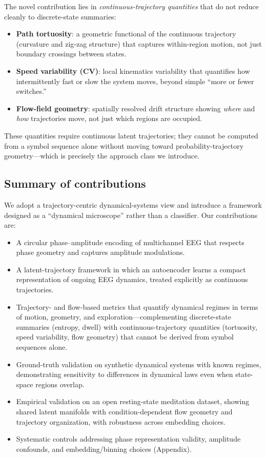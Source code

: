 \documentclass[5p,twocolumn,authoryear]{elsarticle}
\begin{document}
The novel contribution lies in \emph{continuous-trajectory quantities} that do not reduce cleanly to discrete-state summaries:
\begin{itemize}
    \item \textbf{Path tortuosity}: a geometric functional of the continuous trajectory (curvature and zig-zag structure) that captures within-region motion, not just boundary crossings between states.
    \item \textbf{Speed variability (CV)}: local kinematics variability that quantifies how intermittently fast or slow the system moves, beyond simple ``more or fewer switches.''
    \item \textbf{Flow-field geometry}: spatially resolved drift structure showing \emph{where} and \emph{how} trajectories move, not just which regions are occupied.
\end{itemize}
These quantities require continuous latent trajectories; they cannot be computed from a symbol sequence alone without moving toward probability-trajectory geometry---which is precisely the approach class we introduce.

\subsection{Summary of contributions}

We adopt a trajectory-centric dynamical-systems view and introduce a framework designed as a ``dynamical microscope'' rather than a classifier. Our contributions are:
\begin{itemize}
    \item A circular phase--amplitude encoding of multichannel EEG that respects phase geometry and captures amplitude modulations.
    \item A latent-trajectory framework in which an autoencoder learns a compact representation of ongoing EEG dynamics, treated explicitly as continuous trajectories.
    \item Trajectory- and flow-based metrics that quantify dynamical regimes in terms of motion, geometry, and exploration---complementing discrete-state summaries (entropy, dwell) with continuous-trajectory quantities (tortuosity, speed variability, flow geometry) that cannot be derived from symbol sequences alone.
    \item Ground-truth validation on synthetic dynamical systems with known regimes, demonstrating sensitivity to differences in dynamical laws even when state-space regions overlap.
    \item Empirical validation on an open resting-state meditation dataset, showing shared latent manifolds with condition-dependent flow geometry and trajectory organization, with robustness across embedding choices.
    \item Systematic controls addressing phase representation validity, amplitude confounds, and embedding/binning choices (Appendix).
\end{itemize}
\end{document}
